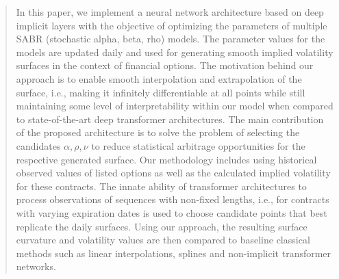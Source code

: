 \begin{abstract}
    In this paper, we implement a neural network architecture based on deep implicit layers with the objective of optimizing the parameters of multiple SABR (stochastic alpha, beta, rho) models. The parameter values for the models are updated daily and used for generating smooth implied volatility surfaces in the context of financial options. The motivation behind our approach is to enable smooth interpolation and extrapolation of the surface, i.e., making it infinitely differentiable at all points while still maintaining some level of interpretability within our model when compared to state-of-the-art deep transformer architectures. The main contribution of the proposed architecture is to solve the problem of selecting the candidates $\alpha, \rho, \nu$ to reduce statistical arbitrage opportunities for the respective generated surface. Our methodology includes using historical observed values of listed options as well as the calculated implied volatility for these contracts. The innate ability of transformer architectures to process observations of sequences with non-fixed lengths, i.e., for contracts with varying expiration dates is used to choose candidate points that best replicate the daily surfaces. Using our approach, the resulting surface curvature and volatility values are then compared to baseline classical methods such as linear interpolations, splines and non-implicit transformer networks.
\end{abstract}
